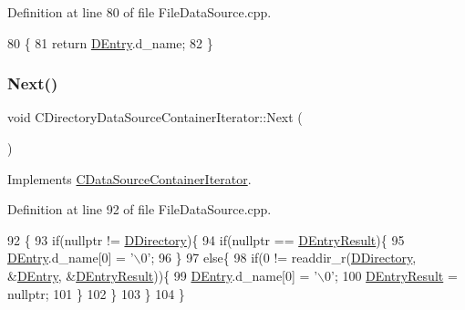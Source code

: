 Definition at line 80 of file File\+Data\+Source.\+cpp.


\begin{DoxyCode}
80                                                      \{
81     \textcolor{keywordflow}{return} \hyperlink{classCDirectoryDataSourceContainerIterator_a69dfb8a9f2ab7f71e7d106d4d6c0e29b}{DEntry}.d\_name;
82 \}
\end{DoxyCode}
\hypertarget{classCDirectoryDataSourceContainerIterator_a2b58c5a78c5820e39cd2d9a61724a55e}{}\label{classCDirectoryDataSourceContainerIterator_a2b58c5a78c5820e39cd2d9a61724a55e} 
\subsubsection{\texorpdfstring{Next()}{Next()}}
{\footnotesize\ttfamily void C\+Directory\+Data\+Source\+Container\+Iterator\+::\+Next (\begin{DoxyParamCaption}{ }\end{DoxyParamCaption})\hspace{0.3cm}{\ttfamily [virtual]}}



Implements \hyperlink{classCDataSourceContainerIterator_a2a9cc99d17cd217727ac4ab5e78f1a35}{C\+Data\+Source\+Container\+Iterator}.



Definition at line 92 of file File\+Data\+Source.\+cpp.


\begin{DoxyCode}
92                                                 \{
93     \textcolor{keywordflow}{if}(\textcolor{keyword}{nullptr} != \hyperlink{classCDirectoryDataSourceContainerIterator_a0e07044b1a916e3dd931ae0778317e16}{DDirectory})\{
94         \textcolor{keywordflow}{if}(\textcolor{keyword}{nullptr} == \hyperlink{classCDirectoryDataSourceContainerIterator_a7e8c1c50ef09013ee6013dcbd1bdc616}{DEntryResult})\{
95             \hyperlink{classCDirectoryDataSourceContainerIterator_a69dfb8a9f2ab7f71e7d106d4d6c0e29b}{DEntry}.d\_name[0] = \textcolor{charliteral}{'\(\backslash\)0'};   
96         \}
97         \textcolor{keywordflow}{else}\{
98             \textcolor{keywordflow}{if}(0 != readdir\_r(\hyperlink{classCDirectoryDataSourceContainerIterator_a0e07044b1a916e3dd931ae0778317e16}{DDirectory}, &\hyperlink{classCDirectoryDataSourceContainerIterator_a69dfb8a9f2ab7f71e7d106d4d6c0e29b}{DEntry}, &\hyperlink{classCDirectoryDataSourceContainerIterator_a7e8c1c50ef09013ee6013dcbd1bdc616}{DEntryResult}))\{
99                 \hyperlink{classCDirectoryDataSourceContainerIterator_a69dfb8a9f2ab7f71e7d106d4d6c0e29b}{DEntry}.d\_name[0] = \textcolor{charliteral}{'\(\backslash\)0'};
100                 \hyperlink{classCDirectoryDataSourceContainerIterator_a7e8c1c50ef09013ee6013dcbd1bdc616}{DEntryResult} = \textcolor{keyword}{nullptr};
101             \}
102         \}
103     \}
104 \}
\end{DoxyCode}


